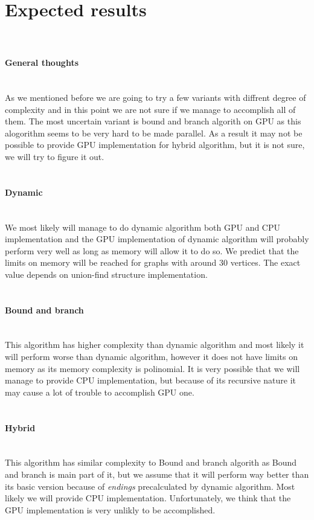 \section{Expected results}
\paragraph{\\\\General thoughts\\\\}
As we mentioned before we are going to try a few variants with diffrent degree of complexity and in this point we are not sure if we manage to accomplish all of them. The most uncertain variant is bound and branch algorith on GPU as this alogorithm seems to be very hard to be made parallel. As a result it may not be possible to provide  GPU implementation for hybrid algorithm, but it is not sure, we will try to figure it out.\\\\
\paragraph{Dynamic\\\\}
We most likely will manage to do dynamic algorithm both GPU and CPU implementation and the GPU implementation of dynamic algorithm will probably perform very well as long as memory will allow it to do so. We predict that the limits on memory will be reached for graphs with around 30 vertices. The exact value depends on union-find structure implementation.\\\\

\paragraph{Bound and branch\\\\}
This algorithm has higher complexity than dynamic algorithm and most likely it will perform worse than dynamic algorithm, however it does not have limits on memory as its memory complexity is polinomial. It is very possible that we will manage to provide CPU implementation, but because of its recursive nature it may cause a lot of trouble to accomplish GPU one.\\\\


\paragraph{Hybrid\\\\}
This algorithm has similar complexity to Bound and branch algorith as Bound and branch is main part of it, but we assume that it will perform way better than its basic version because of \emph{endings} precalculated by dynamic algorithm.
Most likely we will provide CPU implementation. Unfortunately, we think that the GPU implementation is very unlikly to be accomplished.
